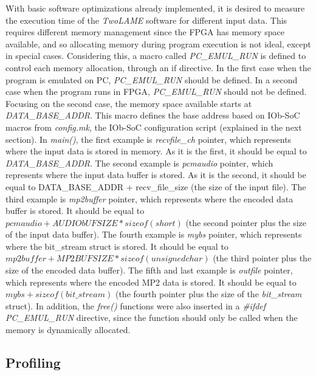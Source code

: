 

With basic software optimizations already implemented, it is desired to measure the execution time of the \textit{TwoLAME} software for different input data. This requires different memory management since the FPGA has memory space available, and so allocating memory during program execution is not ideal, except in special cases. Considering this, a macro called \textit{PC\_EMUL\_RUN} is defined to control each memory allocation, through an if directive. In the first case when the program is emulated on PC, \textit{PC\_EMUL\_RUN} should be defined. In a second case when the program runs in FPGA, \textit{PC\_EMUL\_RUN} should not be defined.
Focusing on the second case, the memory space available starts at \textit{DATA\_BASE\_ADDR}. This macro defines the base address based on IOb-SoC macros from \textit{config.mk}, the IOb-SoC configuration script (explained in the next section).
In \textit{main()}, the first example is \textit{recvfile\_ch} pointer, which represents where the input data is stored in memory. As it is the first, it should be equal to \textit{DATA\_BASE\_ADDR}.
The second example is \textit{pcmaudio} pointer, which represents where the input data buffer is stored. As it is the second, it should be equal to DATA\_BASE\_ADDR + recv\_file\_size (the size of the input file).
The third example is \textit{mp2buffer} pointer, which represents where the encoded data buffer is stored. It should be equal to $pcmaudio + AUDIObUFSIZE*sizeof(short)$ (the second pointer plus the size of the input data buffer).
The fourth example is \textit{mybs} pointer, which represents where the bit\_stream struct is stored. It should be equal to $mp2buffer + MP2BUFSIZE*sizeof(unsigned char)$ (the third pointer plus the size of the encoded data buffer).
The fifth and last example is \textit{outfile} pointer, which represents where the encoded MP2 data is stored. It should be equal to $mybs + sizeof(bit\_stream)$ (the fourth pointer plus the size of the \textit{bit\_stream} struct).
In addition, the \textit{free()} functions were also inserted in a \textit{\#ifdef PC\_EMUL\_RUN} directive, since the function should only be called when the memory is dynamically allocated. \\

\subsection{Profiling}

